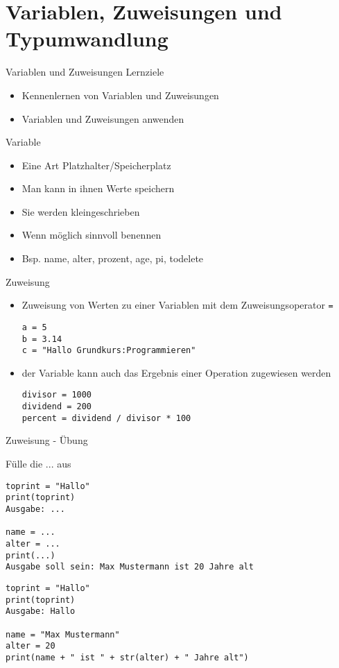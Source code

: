 \section{Variablen, Zuweisungen und Typumwandlung}

\begin{frame}[fragile]{Variablen und Zuweisungen}
Lernziele
\begin{itemize}
	\item Kennenlernen von Variablen und Zuweisungen
	\item Variablen und Zuweisungen anwenden

\end{itemize}
\end{frame}

\begin{frame}[fragile]{Variable}
\begin{itemize}
	\item Eine Art Platzhalter/Speicherplatz
	\item Man kann in ihnen Werte speichern
	\item Sie werden kleingeschrieben
	\item Wenn möglich sinnvoll benennen
	\item Bsp. name, alter, prozent, age, pi, todelete
	
\end{itemize}
\end{frame}


\begin{frame}[fragile]{Zuweisung}
\begin{itemize}
\item Zuweisung von Werten zu einer Variablen mit dem Zuweisungsoperator \texttt{=}
\begin{lstlisting}
a = 5
b = 3.14 
c = "Hallo Grundkurs:Programmieren"
\end{lstlisting}
\item der Variable kann auch das Ergebnis einer Operation zugewiesen werden
\begin{lstlisting}
divisor = 1000
dividend = 200
percent = dividend / divisor * 100
\end{lstlisting}

\end{itemize}
\end{frame}


\begin{frame}[fragile]{Zuweisung - Übung}

Fülle die ... aus
\begin{lstlisting}
toprint = "Hallo"
print(toprint)
Ausgabe: ...

name = ...
alter = ...
print(...)
Ausgabe soll sein: Max Mustermann ist 20 Jahre alt
\end{lstlisting}

\pause{}

\begin{lstlisting}
toprint = "Hallo"
print(toprint)
Ausgabe: Hallo

name = "Max Mustermann"
alter = 20
print(name + " ist " + str(alter) + " Jahre alt")
\end{lstlisting}

\end{frame}



